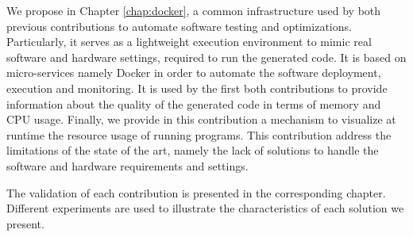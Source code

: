 \begin{itemize}
	We propose in Chapter \ref{chap:docker}, a common infrastructure used by both previous contributions to automate software testing and optimizations. Particularly, it serves as a lightweight execution environment to mimic real software and hardware settings, required to run the generated code. It is based on micro-services namely Docker in order to automate the software deployment, execution and monitoring. It is used by the first both contributions to provide information about the quality of the generated code in terms of memory and CPU usage. Finally, we provide in this contribution a mechanism to visualize at runtime the resource usage of running programs. This contribution address the limitations of the state of the art, namely the lack of solutions to handle the software and hardware requirements and settings.
\end{itemize}

The validation of each contribution is presented in the corresponding chapter. Different experiments are used to illustrate the characteristics of each solution we present.




